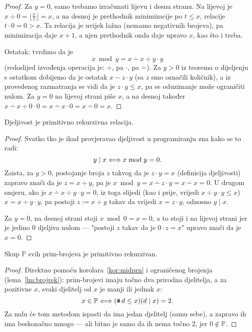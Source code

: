 \begin{proof}
Za $y=0$, samo trebamo izračunati lijevu i desnu stranu. Na lijevoj je $x\div 0=\bigl\lfloor\frac{x}{1}\bigr\rfloor=x$, a na desnoj je prethodnik minimizacije po $t\le x$, relacije $t\cdot 0=0>x$. Ta relacija je uvijek lažna (nemamo negativnih brojeva), pa minimizacija daje $x+1$, a njen prethodnik onda daje upravo $x$, kao što i treba.

Ostatak: tvrdimo da je
\begin{equation}
    x\bmod y=x\dotminus x\div y\cdot y
\end{equation}
(redoslijed izvođenja operacija je: $\div$, pa $\cdot$, pa $\dotminus$). Za $y>0$ iz teorema o dijeljenju s ostatkom dobijemo da je ostatak $x-z\cdot y$ (sa $z$ smo označili količnik), a iz provedenog razmatranja se vidi da je $z\cdot y\le x$, pa se oduzimanje može ograničiti nulom. Za $y=0$ na lijevoj strani piše $x$, a na desnoj također $x\dotminus x\div0\cdot 0=x\dotminus x\cdot0=x\dotminus0=x$.
\end{proof}

\begin{korolar}[{name=[primitivna rekurzivnost djeljivosti]}]\label{kor:midprn}
Djeljivost je primitivno rekurzivna relacija.
\end{korolar}
\begin{proof}
Svatko tko je ikad provjeravao djeljivost u programiranju zna kako se to radi:
\begin{equation}
    y\mid x\Longleftrightarrow x\bmod y=0\text.
\end{equation}
Zaista, za $y>0$, postojanje broja $z$ takvog da je $z\cdot y=x$ (definicija djeljivosti) zapravo znači da je $z=x\div y$, pa je $x\bmod y=x\dotminus z\cdot y=x\dotminus x=0$. U drugom smjeru, ako je $x\dotminus x\div y\cdot y=0$, iz toga slijedi (kao i prije, vrijedi $x\div y\cdot y\le x$) $x=x\div y\cdot y$, pa postoji $z:=x\div y$ takav da vrijedi $x=z\cdot y$, odnosno $y\mid x$.

Za $y=0$, na desnoj strani stoji $x\bmod 0=x=0$, a to stoji i na lijevoj strani jer je jedino $0$ djeljiva nulom --- "postoji $z$ takav da je $0\cdot z=x$" upravo znači da je $x=0$.
\end{proof}

\begin{korolar}[{name=[primitivna rekurzivnost skupa svih prim-brojeva]}]
    Skup $\mathbb P$ svih prim-brojeva je primitivno rekurzivan.
\end{korolar}
\begin{proof}
Direktno pomoću korolara~\ref{kor:midprn} i ograničenog brojenja (lema~\ref{lm:brojrek}): prim-brojevi imaju točno dva prirodna djelitelja, a za pozitivne $x$, svaki djelitelj od $x$ je manji ili jednak $x$:
\begin{equation}\label{eq:Pprn}
    x\in\mathbb P\Longleftrightarrow(\texttt{\textup{\#}}\, d\le x)(d\mid x)=2\text.
\end{equation}
Za nulu će tom metodom ispasti da ima jedan djelitelj (samu sebe), a zapravo ih ima beskonačno mnogo --- ali bitno je samo da ih nema točno $2$, jer $0\notin\mathbb P$.
\end{proof}

